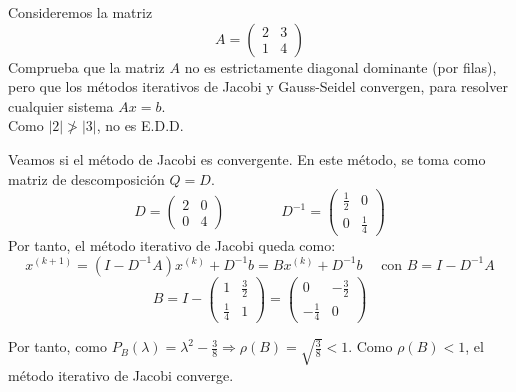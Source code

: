 \begin{ejercicio}
    Consideremos la matriz
    $$A=\left( \begin{array}{cc}
        2 & 3 \\
        1 & 4
    \end{array} \right)$$
    Comprueba que la matriz $A$ no es estrictamente diagonal dominante (por filas), pero que los métodos iterativos de Jacobi y Gauss-Seidel convergen, para resolver cualquier sistema $Ax = b$.\\

    Como $|2| \ngtr |3|$, no es E.D.D. 

    Veamos si el método de Jacobi es convergente. En este método, se toma como matriz de descomposición $Q=D$.
    $$D=\left( \begin{array}{cc}
        2 & 0 \\
        0 & 4
    \end{array} \right)
    \qquad \qquad
    D^{-1}=\left( \begin{array}{cc}
        \frac{1}{2} & 0 \\
        0 & \frac{1}{4}
    \end{array} \right)$$
    Por tanto, el método iterativo de Jacobi queda como:
    $$x^{(k+1)} = (I-D^{-1}A)x^{(k)} + D^{-1}b 
    =Bx^{(k)} + D^{-1}b
    \quad \text{ con } B=I-D^{-1}A$$
    $$B=I-\left( \begin{array}{cc}
        1 & \frac{3}{2} \\
        \frac{1}{4} & 1
    \end{array} \right)
    = \left( \begin{array}{cc}
        0 & -\frac{3}{2} \\
        -\frac{1}{4} & 0
    \end{array} \right)$$

    Por tanto, como $P_B(\lambda) = \lambda^2 -\frac{3}{8} \Longrightarrow \rho(B) = \sqrt{\frac{3}{8}} < 1$. Como $\rho(B)<1$, el método iterativo de Jacobi converge.


\end{ejercicio}
